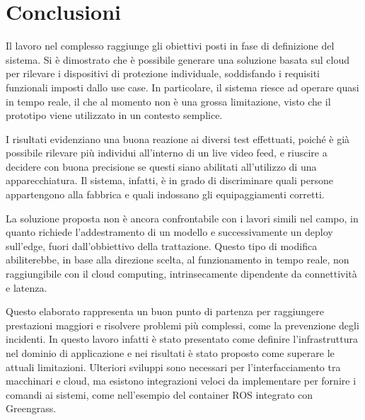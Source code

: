 \chapter*{Conclusioni}

Il lavoro nel complesso raggiunge gli obiettivi posti in fase di definizione del sistema. Si è dimostrato che è possibile generare una soluzione basata sul cloud per rilevare i dispositivi di protezione individuale, soddisfando i requisiti funzionali imposti dallo use case. In particolare, il sistema riesce ad operare quasi in tempo reale, il che al momento non è una grossa limitazione, visto che il prototipo viene utilizzato in un contesto semplice.


I risultati evidenziano una buona reazione ai diversi test effettuati, poiché è già possibile rilevare più individui all'interno di un live video feed, e riuscire a decidere con buona precisione se questi siano abilitati all'utilizzo di una apparecchiatura. Il sistema, infatti, è in grado di discriminare quali persone appartengono alla fabbrica e quali indossano gli equipaggiamenti corretti.

La soluzione proposta non è ancora confrontabile con i lavori simili nel campo, in quanto richiede l'addestramento di un modello e successivamente un deploy sull'edge, fuori dall'obbiettivo della trattazione. Questo tipo di modifica abiliterebbe, in base alla direzione scelta, al funzionamento in tempo reale, non raggiungibile con il cloud computing, intrinsecamente dipendente da connettività e latenza. 

Questo elaborato rappresenta un buon punto di partenza per raggiungere prestazioni maggiori e risolvere problemi più complessi, come la prevenzione degli incidenti. In questo lavoro infatti è stato presentato come definire l'infrastruttura nel dominio di applicazione e nei risultati è stato proposto come superare le attuali limitazioni.  %
Ulteriori sviluppi sono necessari per l'interfacciamento tra macchinari e cloud, ma esistono integrazioni veloci da implementare per fornire i comandi ai sistemi, come nell'esempio del container ROS integrato con Greengrass. 